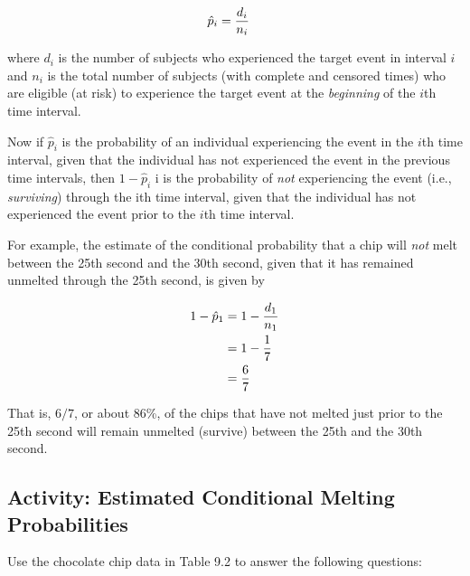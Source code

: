 \documentclass[
]{book}
\begin{document}
\begin{align}
\hat p_i &= \frac{d_i}{n_i}
\notag
\end{align}

where \(d_i\) is the number of subjects who experienced the target event in interval \(i\) and \(n_i\) is the total number of subjects (with complete and censored times) who are eligible (at risk) to experience the target event at the \emph{beginning} of the \(i\)th time interval.

Now if \(\hat p_i\) is the probability of an individual experiencing the event in the \(i\)th time interval, given that the
individual has not experienced the event in the previous time intervals, then \(1 - \hat p_i\)
i is the probability of \emph{not} experiencing the event (i.e., \emph{surviving}) through the ith time interval, given that the individual has not experienced the event prior to the \(i\)th time interval.

For example, the estimate of the conditional probability that a chip will \emph{not} melt between the 25th second
and the 30th second, given that it has remained unmelted through the 25th second, is given by

\begin{align}
1 - \hat p_1 &= 1 - \frac{d_1}{n_1} \notag \\
&= 1 - \frac{1}{7} \notag \\
&= \frac{6}{7} \notag
\end{align}

That is, \(6/7\), or about 86\%, of the chips that have not melted just prior to the 25th second will remain unmelted (survive) between the 25th and the 30th second.

\hypertarget{activity-estimated-conditional-melting-probabilities}{%
\subsection*{Activity: Estimated Conditional Melting Probabilities}\label{activity-estimated-conditional-melting-probabilities}}

Use the chocolate chip data in Table 9.2 to answer the following questions:
\end{document}
